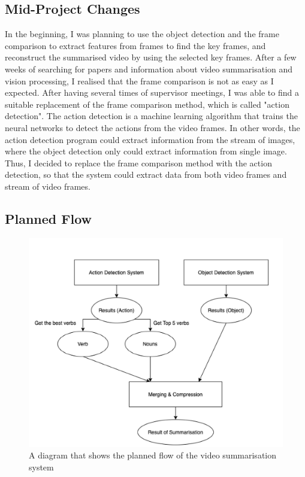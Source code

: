 \documentclass{article}
\begin{document}
\subsection{Mid-Project Changes}

In the beginning, I was planning to use the object detection and the frame comparison to extract features from frames to find the key frames, and reconstruct the summarised video by using the selected key frames. After a few weeks of searching for papers and information about video summarisation and vision processing, I realised that the frame comparison is not as easy as I expected. After having several times of supervisor meetings, I was able to find a suitable replacement of the frame comparison method, which is called "action detection". The action detection is a machine learning algorithm that trains the neural networks to detect the actions from the video frames. In other words, the action detection program could extract information from the stream of images, where the object detection only could extract information from single image. Thus, I decided to replace the frame comparison method with the action detection, so that the system could extract data from both video frames and stream of video frames.

\subsection{Planned Flow}

\begin{figure}[H]
    \centering
    \includegraphics[scale=0.4]{imgs/PlannedFlow.png}
    \caption{A diagram that shows the planned flow of the video summarisation system}
    \label{fig:planned_flow}
\end{figure}
\end{document}
